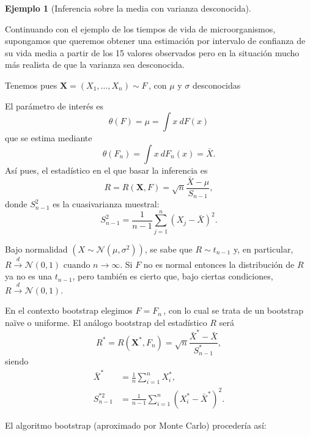 \documentclass[
]{book}
\theoremstyle{break}
\theoremstyle{definition}
\theoremstyle{definition}
\newtheorem{example}{Ejemplo}[chapter]
\theoremstyle{definition}
\theoremstyle{definition}
\theoremstyle{remark}
\begin{document}
\begin{example}[Inferencia sobre la media con varianza desconocida]
\protect\hypertarget{exm:media-dt-desconocida}{}{\label{exm:media-dt-desconocida} \iffalse (Inferencia sobre la media con varianza desconocida) \fi{} } \vspace{0.5cm}

Continuando con el ejemplo de los tiempos de vida de microorganismos,
supongamos que queremos obtener una estimación por intervalo de confianza
de su vida media a partir de los 15 valores observados pero en la
situación mucho más realista de que la varianza sea desconocida.
\end{example}

Tenemos pues
\(\mathbf{X}=\left( X_1,\ldots ,X_n \right) \sim F\,\), con
\(\mu\) y \(\sigma\) desconocidas

El parámetro de interés es
\[\theta \left( F \right) =\mu =\int x~dF\left( x \right)\]
que se estima mediante
\[\theta \left( F_n \right) =\int x~dF_n\left( x \right) =\bar{X}.\]
Así pues, el estadístico en el que basar la inferencia es
\[R=R\left( \mathbf{X},F \right) =\sqrt{n}\frac{\bar{X}-\mu }{S_{n-1}},\]
donde \(S_{n-1}^2\) es la cuasivarianza muestral:
\[S_{n-1}^2=\frac{1}{n-1}\sum_{j=1}^{n}\left( X_j-\bar{X} \right)^2.\]

Bajo normalidad \(\left( X\sim \mathcal{N}\left( \mu ,\sigma^2 \right) \right)\),
se sabe que \(R\sim t_{n-1}\) y, en particular,
\(R\overset{d}{\rightarrow } \mathcal{N}\left( 0,1 \right)\) cuando \(n\rightarrow \infty\).
Si \(F\) no es normal entonces la distribución de \(R\) ya no es una \(t_{n-1}\),
pero también es cierto que, bajo ciertas condiciones,
\(R\overset{d}{\rightarrow}\mathcal{N}\left(0,1 \right)\).

En el contexto bootstrap elegimos \(\hat{F}=F_n\,\), con lo cual se
trata de un bootstrap naïve o uniforme. El análogo bootstrap del
estadístico \(R\) será
\[R^{\ast}=R\left( \mathbf{X}^{\ast},F_n \right) =\sqrt{n}\frac{
\bar{X}^{\ast}-\bar{X}}{S_{n-1}^{\ast}},\]
siendo
\[\begin{aligned}
\bar{X}^{\ast} &= \frac{1}{n}\sum_{i=1}^{n}X_i^{\ast}, \\
S_{n-1}^{\ast 2} &= \frac{1}{n-1}\sum_{i=1}^{n}\left( X_i^{\ast}-
\bar{X}^{\ast} \right)^2.
\end{aligned}\]

El algoritmo bootstrap (aproximado por Monte Carlo) procedería así:
\end{document}
